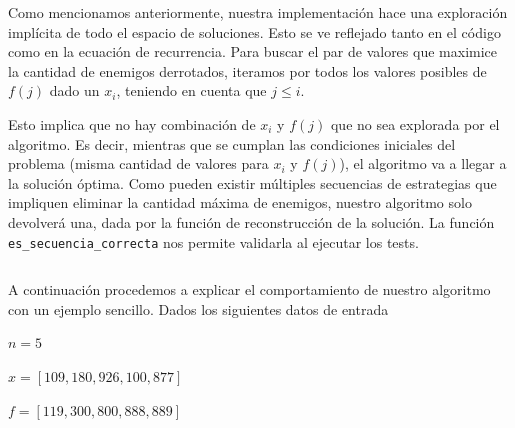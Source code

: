 \documentclass{article}
\begin{document}
Como mencionamos anteriormente, nuestra implementación hace una exploración implícita de todo el espacio de soluciones. Esto se ve reflejado tanto en el código como en la ecuación de recurrencia. Para buscar el par de valores que maximice la cantidad de enemigos derrotados, iteramos por todos los valores posibles de $f(j)$ dado un $x_i$, teniendo en cuenta que $j \leq i$.

Esto implica que no hay combinación de $x_i$ y $f(j)$ que no sea explorada por el algoritmo. Es decir, mientras que se cumplan las condiciones iniciales del problema (misma cantidad de valores para $x_i$ y $f(j)$), el algoritmo va a llegar a la solución óptima. Como pueden existir múltiples secuencias de estrategias que impliquen eliminar la cantidad máxima de enemigos, nuestro algoritmo solo devolverá una, dada por la función de reconstrucción de la solución. La función \texttt{es\_secuencia\_correcta} nos permite validarla al ejecutar los tests.

\inputminted[linenos, firstline=86, lastline=104]{python}{codigo/algoritmo.py}

A continuación procedemos a explicar el comportamiento de nuestro algoritmo con un ejemplo sencillo. Dados los siguientes datos de entrada

$n = 5$

$x = [109, 180, 926, 100, 877]$

$f = [119, 300, 800, 888, 889]$
\end{document}
